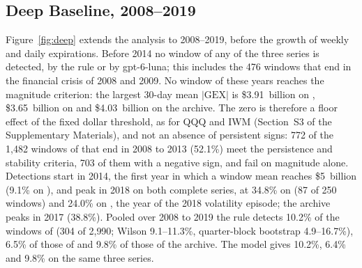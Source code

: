 \subsection{Deep Baseline, 2008--2019}
\label{sec:results:deep}

Figure~\ref{fig:deep} extends the analysis to 2008--2019, before the growth of weekly and daily expirations.
Before 2014 no window of any of the three series is detected, by the rule or by gpt-6-luna; this includes the 476 windows that end in the financial crisis of 2008 and 2009. No window of these years reaches the magnitude criterion: the largest 30-day mean $|\mathrm{GEX}|$ is \$3.91~billion on , \$3.65~billion on  and \$4.03~billion on the archive. The zero is therefore a floor effect of the fixed dollar threshold, as for QQQ and IWM (Section~S3 of the Supplementary Materials), and not an absence of persistent signs: 772 of the 1{,}482 windows of  that end in 2008 to 2013 (52.1\%) meet the persistence and stability criteria, 703 of them with a negative sign, and fail on magnitude alone. Detections start in 2014, the first year in which a window mean reaches \$5~billion (9.1\% on ), and peak in 2018 on both complete series, at 34.8\% on  (87 of 250 windows) and 24.0\% on , the year of the 2018 volatility episode; the archive peaks in 2017 (38.8\%). Pooled over 2008 to 2019 the rule detects 10.2\% of the windows of  (304 of 2{,}990; Wilson 9.1--11.3\%, quarter-block bootstrap 4.9--16.7\%), 6.5\% of those of  and 9.8\% of those of the archive. The model gives 10.2\%, 6.4\% and 9.8\% on the same three series.

